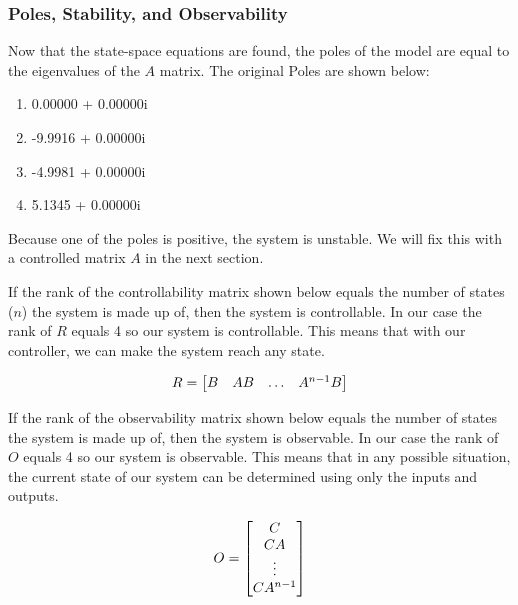 \documentclass{article}
\begin{document}
\subsubsection{Poles, Stability, and Observability}
Now that the state-space equations are found, the poles of the model are equal to the eigenvalues of the $A$ matrix. The original Poles are shown below:
\begin{enumerate}
  \item   0.00000 + 0.00000i
  \item -9.9916 + 0.00000i
  \item -4.9981 + 0.00000i
  \item 5.1345 + 0.00000i
\end{enumerate}
Because one of the poles is positive, the system is unstable. We will fix this with a controlled matrix $A$ in the next section.

If the rank of the controllability matrix shown below equals the number of states ($n$) the system is made up of, then the system is controllable. In our case the rank of $R$ equals 4 so our system is controllable. This means that with our controller, we can make the system reach any state.

\begin{equation} 
\label{ctrb}
\centering
R = \begin{bmatrix}
	B&AB&\hdots&A^{n-1}B\\
	\end{bmatrix}
\end{equation}
 
 If the rank of the observability matrix shown below equals the number of states the system is made up of, then the system is observable. In our case the rank of $O$ equals 4 so our system is observable. This means that in any possible situation, the current state of our system can be determined using only the inputs and outputs.
 
 \begin{equation} 
\label{obsv}
\centering
O = \begin{bmatrix}
	C\\
	CA\\
	\vdots\\
	CA^{n-1}\\
	\end{bmatrix}
\end{equation}
\end{document}
